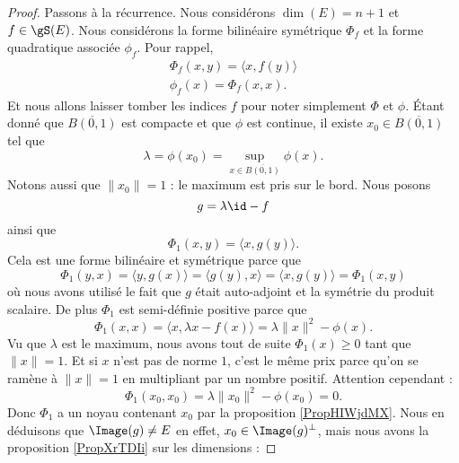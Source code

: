 \begin{proof}
    Passons à la récurrence. Nous considérons \( \dim(E)=n+1\) et \( f\in\gS(E)\). Nous considérons la forme bilinéaire symétrique \( \Phi_f\) et la forme quadratique associée \( \phi_f\). Pour rappel,
    \begin{subequations}
        \begin{align}
        \Phi_f(x,y)=\langle x, f(y)\rangle \\
        \phi_f(x)=\Phi_f(x,x).
        \end{align}
    \end{subequations}
    Et nous allons laisser tomber les indices \( f\) pour noter simplement \( \Phi\) et \( \phi\). Étant donné que \( \overline{ B(0,1) }\) est compacte et que \( \phi\) est continue, il existe \( x_0\in\overline{ B(0,1) }\) tel que 
    \begin{equation}
        \lambda=\phi(x_0)=\sup_{x\in\overline{ B(0,1) }}\phi(x).
    \end{equation}
    Notons aussi que \( \| x_0 \|=1\) : le maximum est pris sur le bord. Nous posons
    \begin{equation}
        g=\lambda\id-f
    \end{equation}
    ainsi que 
    \begin{equation}
        \Phi_1(x,y)=\langle x, g(y)\rangle .
    \end{equation}
    Cela est une forme bilinéaire et symétrique parce que
    \begin{equation}
        \Phi_1(y,x)=\langle y, g(x)\rangle =\langle g(y), x\rangle =\langle x, g(y)\rangle =\Phi_1(x,y)
    \end{equation}
    où nous avons utilisé le fait que \( g\) était auto-adjoint et la symétrie du produit scalaire. De plus \( \Phi_1\) est semi-définie positive parce que
    \begin{equation}
        \Phi_1(x,x)=\langle x, \lambda x-f(x)\rangle =\lambda\| x \|^2-\phi(x).
    \end{equation}
    Vu que \( \lambda\) est le maximum, nous avons tout de suite \( \Phi_1(x)\geq 0\) tant que \( \| x \|=1\). Et si \( x\) n'est pas de norme \( 1\), c'est le même prix parce qu'on se ramène à \( \| x \|=1\) en multipliant par un nombre positif. Attention cependant : 
    \begin{equation}
        \Phi_1(x_0,x_0)=\lambda\| x_0 \|^2-\phi(x_0)=0.
    \end{equation}
    Donc \( \Phi_1\) a un noyau contenant \( x_0\) par la proposition \ref{PropHIWjdMX}. Nous en déduisons que \( \Image(g)\neq E\) en effet, \( x_0\in\Image(g)^{\perp}\), mais nous avons la proposition \ref{PropXrTDIi} sur les dimensions : 

\end{proof}
